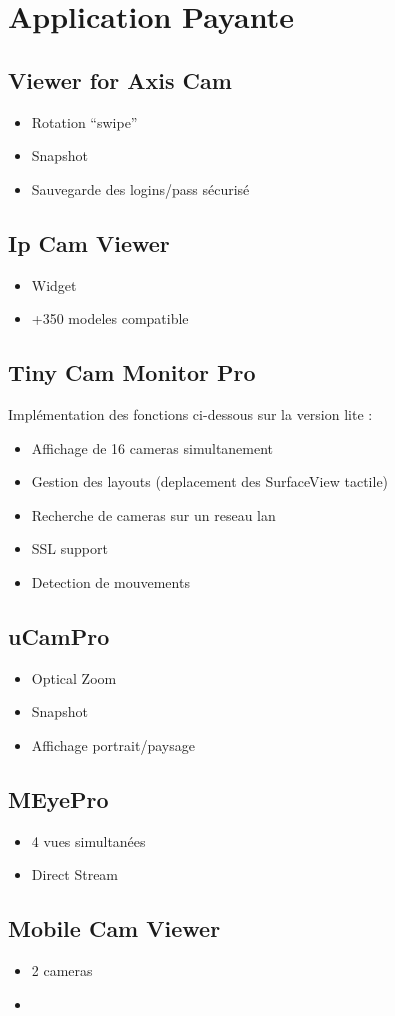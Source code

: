 \documentclass[a4paper,10pt]{report}
\begin{document}
\chapter{Application Payante}
\section{Viewer for Axis Cam}
\begin{itemize}
  \item Rotation ``swipe''
  \item Snapshot
  \item Sauvegarde des logins/pass sécurisé
\end{itemize}

\section{Ip Cam Viewer}
\begin{itemize}
  \item Widget
  \item +350 modeles compatible
\end{itemize}

\section{Tiny Cam Monitor Pro}
Implémentation des fonctions ci-dessous sur la version lite :
\begin{itemize}
  \item Affichage de 16 cameras simultanement
  \item Gestion des layouts (deplacement des SurfaceView tactile)
  \item Recherche de cameras sur un reseau lan
  \item SSL support
  \item Detection de mouvements
\end{itemize}

\section{uCamPro}
\begin{itemize}
  \item Optical Zoom
  \item Snapshot
  \item Affichage portrait/paysage
\end{itemize}

\section{MEyePro}
\begin{itemize}
  \item 4 vues simultanées
  \item Direct Stream
\end{itemize}


\section{Mobile Cam Viewer}
\begin{itemize}
  \item 2 cameras
  \item
\end{itemize}
\end{document}
